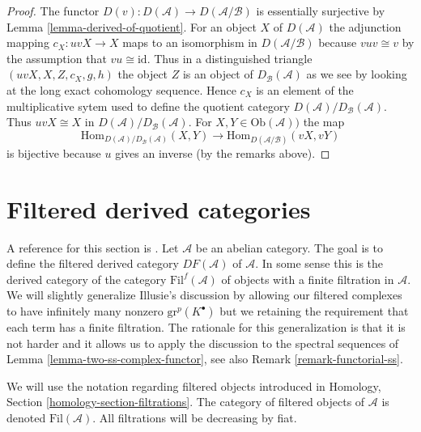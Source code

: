 \begin{proof}
The functor $D(v) : D(\mathcal{A}) \to D(\mathcal{A}/\mathcal{B})$
is essentially surjective by
Lemma \ref{lemma-derived-of-quotient}.
For an object $X$ of $D(\mathcal{A})$ the adjunction mapping
$c_X : uvX \to X$ maps to an isomorphism in $D(\mathcal{A}/\mathcal{B})$
because $vuv \cong v$ by the assumption that $vu \cong \text{id}$.
Thus in a distinguished triangle $(uvX, X, Z, c_X, g, h)$ the object
$Z$ is an object of $D_\mathcal{B}(\mathcal{A})$ as we see by looking
at the long exact cohomology sequence.
Hence $c_X$ is an element of the multiplicative sytem used to define
the quotient category $D(\mathcal{A})/D_\mathcal{B}(\mathcal{A})$.
Thus $uvX \cong X$ in $D(\mathcal{A})/D_\mathcal{B}(\mathcal{A})$.
For $X, Y \in \text{Ob}(\mathcal{A}))$ the map
$$
\text{Hom}_{D(\mathcal{A})/D_\mathcal{B}(\mathcal{A})}(X, Y)
\longrightarrow
\text{Hom}_{D(\mathcal{A}/\mathcal{B})}(vX, vY)
$$
is bijective because $u$ gives an inverse (by the remarks above).
\end{proof}









\section{Filtered derived categories}
\label{section-filtered-derived-category}

\noindent
A reference for this section is \cite[I, Chapter V]{cotangent}.
Let $\mathcal{A}$ be an abelian category.
The goal is to define the filtered derived category $DF(\mathcal{A})$
of $\mathcal{A}$. In some sense this is the derived category
of the category $\text{Fil}^f(\mathcal{A})$
of objects with a finite filtration in $\mathcal{A}$.
We will slightly generalize Illusie's discussion by allowing our
filtered complexes to have infinitely many nonzero $\text{gr}^p(K^\bullet)$
but we retaining the requirement that each term has a finite filtration.
The rationale for this generalization is that it is not
harder and it allows us to apply the discussion to the spectral sequences of
Lemma \ref{lemma-two-ss-complex-functor}, see also
Remark \ref{remark-functorial-ss}.

\medskip\noindent
We will use the notation regarding filtered objects introduced in
Homology, Section \ref{homology-section-filtrations}.
The category of filtered objects of $\mathcal{A}$ is
denoted $\text{Fil}(\mathcal{A})$.
All filtrations will be decreasing by fiat.

